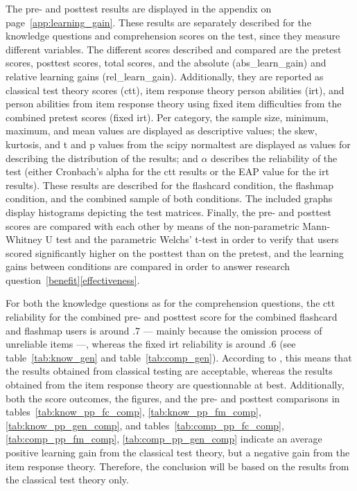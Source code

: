 The pre- and posttest results are displayed in the  appendix on page~\ref{app:learning_gain}. These results are separately described for the knowledge questions and comprehension scores on the test, since they measure different variables. The different scores described and compared are the pretest scores, posttest scores, total scores, and the absolute (abs\_learn\_gain) and relative learning gains (rel\_learn\_gain). Additionally, they are reported as classical test theory scores (ctt), item response theory person abilities (irt), and person abilities from item response theory using fixed item difficulties from the combined pretest scores (fixed irt). Per category, the sample size, minimum, maximum, and mean values are displayed as descriptive values; the skew, kurtosis, and t and p values from the scipy normaltest are displayed as values for describing the distribution of the results; and $\alpha$ describes the reliability of the test (either Cronbach's alpha for the ctt results or the EAP value for the irt results). These results are described for the flashcard condition, the flashmap condition, and the combined sample of both conditions. The included graphs display histograms depicting the test matrices. Finally, the pre- and posttest scores are compared with each other by means of the non-parametric Mann-Whitney U test and the parametric Welchs' t-test in order to verify that users scored significantly higher on the posttest than on the pretest, and the learning gains between conditions are compared in order to answer research question~\ref{benefit}\ref{effectiveness}.

For both the knowledge questions as for the comprehension questions, the ctt reliability for the combined pre- and posttest score for the combined flashcard and flashmap users is around .7 --- mainly because the omission process of unreliable items ---, whereas the fixed irt reliability is around .6 (see table~\ref{tab:know_gen} and table~\ref{tab:comp_gen}). According to , this means that the results obtained from classical testing are acceptable, whereas the results obtained from the item response theory are questionnable at best. Additionally, both the score outcomes, the figures, and the pre- and posttest comparisons in tables~\ref{tab:know_pp_fc_comp}, \ref{tab:know_pp_fm_comp}, \ref{tab:know_pp_gen_comp}, and tables~\ref{tab:comp_pp_fc_comp}, \ref{tab:comp_pp_fm_comp}, \ref{tab:comp_pp_gen_comp} indicate an average positive learning gain from the classical test theory, but a negative gain from the item response theory. Therefore, the conclusion will be based on the results from the classical test theory only.


